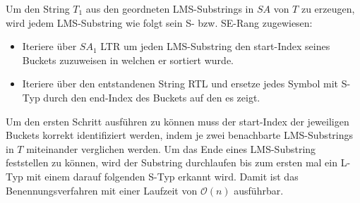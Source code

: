Um den String $T_1$ aus den geordneten LMS-Substrings in $SA$ von $T$ zu erzeugen, wird jedem LMS-Substring wie folgt sein S- bzw. SE-Rang zugewiesen:

\begin{itemize}
\item Iteriere über $SA_1$ LTR um jeden LMS-Substring den start-Index seines Buckets zuzuweisen in welchen er sortiert wurde.
\item Iteriere über den entstandenen String RTL und ersetze jedes Symbol mit S-Typ durch den end-Index des Buckets auf den es zeigt.
\end{itemize}

Um den ersten Schritt ausführen zu können muss der start-Index der jeweiligen Buckets korrekt identifiziert werden, indem je zwei benachbarte LMS-Substrings in $T$ miteinander verglichen werden. Um das Ende eines LMS-Substring feststellen zu können, wird der Substring durchlaufen bis zum ersten mal ein L-Typ mit einem darauf folgenden S-Typ erkannt wird. Damit ist das Benennungsverfahren mit einer Laufzeit von $\mathcal O(n)$ ausführbar.
